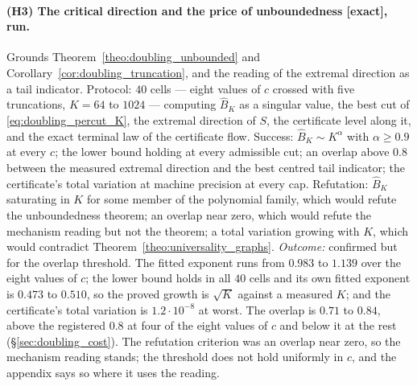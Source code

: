 \paragraph{(H3) The critical direction and the price of unboundedness [exact], run.}
Grounds Theorem~\ref{theo:doubling_unbounded} and Corollary~\ref{cor:doubling_truncation}, and the
reading of the extremal direction as a tail indicator. Protocol: $40$ cells --- eight values of
$c$ crossed with five truncations, $K=64$ to $1024$ --- computing $\widehat B_K$ as a singular
value, the best cut of \eqref{eq:doubling_percut_K}, the extremal direction of $S$, the
certificate level along it, and the exact terminal law of the certificate flow. Success:
$\widehat B_K\sim K^\alpha$ with $\alpha\geq0.9$ at every $c$; the lower bound holding at every
admissible cut; an overlap above $0.8$ between the measured extremal direction and the best
centred tail indicator; the certificate's total variation at machine precision at every cap.
Refutation: $\widehat B_K$ saturating in $K$ for some member of the polynomial family, which
would refute the unboundedness theorem; an overlap near zero, which would refute the mechanism
reading but not the theorem; a total variation growing with $K$, which would contradict
Theorem~\ref{theo:universality_graphs}. \emph{Outcome:} confirmed but for the overlap
threshold. The fitted exponent runs from $0.983$ to $1.139$ over the eight values of $c$; the
lower bound holds in all $40$ cells and its own fitted exponent is $0.473$ to $0.510$, so the
proved growth is $\sqrt K$ against a measured $K$; and the certificate's total variation is
$1.2\cdot10^{-8}$ at worst. The overlap is $0.71$ to $0.84$, above the registered $0.8$ at four
of the eight values of $c$ and below it at the rest (\S\ref{sec:doubling_cost}). The refutation
criterion was an overlap near zero, so the mechanism reading stands; the threshold does not
hold uniformly in $c$, and the appendix says so where it uses the reading.
